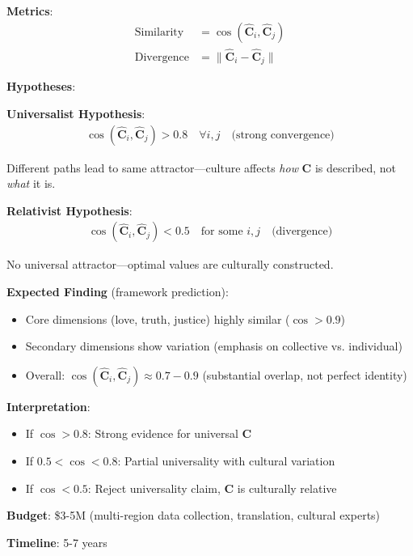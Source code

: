 \documentclass[11pt,a4paper]{article}
\theoremstyle{definition}
\theoremstyle{remark}
\begin{document}
\begin{small}
\begin{enumerate}
\begin{protocol}
\textbf{Metrics}:
\begin{align}
\text{Similarity} &= \cos(\hat{\mathbf{C}}_i, \hat{\mathbf{C}}_j) \\
\text{Divergence} &= \|\hat{\mathbf{C}}_i - \hat{\mathbf{C}}_j\|
\end{align}

\textbf{Hypotheses}:

\textbf{Universalist Hypothesis}:
\begin{align}
\cos(\hat{\mathbf{C}}_i, \hat{\mathbf{C}}_j) > 0.8 \quad \forall i, j \quad \text{(strong convergence)}
\end{align}

Different paths lead to same attractor—culture affects \textit{how} \(\mathbf{C}\) is described, not \textit{what} it is.

\textbf{Relativist Hypothesis}:
\begin{align}
\cos(\hat{\mathbf{C}}_i, \hat{\mathbf{C}}_j) < 0.5 \quad \text{for some } i, j \quad \text{(divergence)}
\end{align}

No universal attractor—optimal values are culturally constructed.

\textbf{Expected Finding} (framework prediction):
\begin{itemize}
    \item Core dimensions (love, truth, justice) highly similar (\(\cos > 0.9\))
    \item Secondary dimensions show variation (emphasis on collective vs. individual)
    \item Overall: \(\cos(\hat{\mathbf{C}}_i, \hat{\mathbf{C}}_j) \approx 0.7-0.9\) (substantial overlap, not perfect identity)
\end{itemize}

\textbf{Interpretation}:
\begin{itemize}
    \item If \(\cos > 0.8\): Strong evidence for universal \(\mathbf{C}\)
    \item If \(0.5 < \cos < 0.8\): Partial universality with cultural variation
    \item If \(\cos < 0.5\): Reject universality claim, \(\mathbf{C}\) is culturally relative
\end{itemize}

\textbf{Budget}: \$3-5M (multi-region data collection, translation, cultural experts)

\textbf{Timeline}: 5-7 years
\end{protocol}


\end{enumerate}
\end{small}
\end{document}
